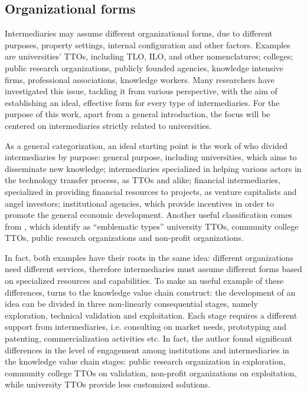 \subsection{Organizational forms}

Intermediaries may assume different organizational forms, due to different purposes, property settings, internal configuration and other factors. Examples are universities' TTOs, including TLO, ILO, and other nomenclatures; colleges; public research organizations, publicly founded agencies, knowledge intensive firms, professional associations, knowledge workers. Many researchers have investigated this issue, tackling it from various perspective, with the aim of establishing an ideal, effective form for every type of intermediaries. For the purpose of this work, apart from a general introduction, the focus will be centered on intermediaries strictly related to universities.

As a general categorization, an ideal starting point is the work of \citet{Yusuf2008} who divided intermediaries by purpose: general purpose, including universities, which aims to disseminate new knowledge; intermediaries specialized in helping various actors in the technology transfer process, as TTOs and alike; financial intermediaries, specialized in providing financial resources to projects, as venture capitalists and angel investors; institutional agencies, which provide incentives in order to promote the general economic development. Another useful classification comes from \citet{Landry2013}, which identify as \enquote{emblematic types} university TTOs, community college TTOs, public research organizations and non-profit organizations.

In fact, both examples have their roots in the same idea: different organizations need different services, therefore intermediaries must assume different forms based on specialized resources and capabilities. To make an useful example of these differences, \citet{Landry2013} turns to the knowledge value chain construct: the development of an idea can be divided in three non-linearly consequential stages, namely exploration, technical validation and exploitation. Each stage requires a different support from intermediaries, i.e. consulting on market needs, prototyping and patenting, commercialization activities etc. In fact, the author found significant differences in the level of engagement among institutions and intermediaries in the knowledge value chain stages: public research organization in exploration, community college TTOs on validation, non-profit organizations on exploitation, while university TTOs provide less customized solutions.


